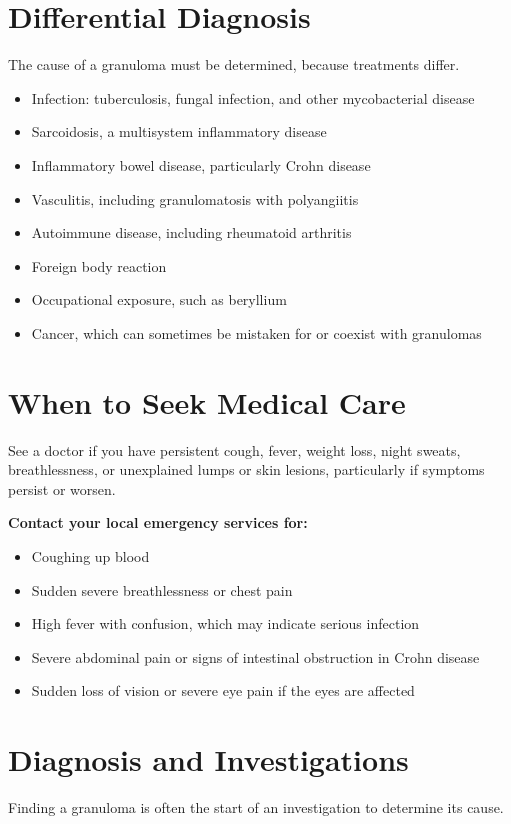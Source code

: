 \section*{Differential Diagnosis}
The cause of a granuloma must be determined, because treatments differ.

\begin{itemize}
    \item Infection: tuberculosis, fungal infection, and other mycobacterial disease
    \item Sarcoidosis, a multisystem inflammatory disease
    \item Inflammatory bowel disease, particularly Crohn disease
    \item Vasculitis, including granulomatosis with polyangiitis
    \item Autoimmune disease, including rheumatoid arthritis
    \item Foreign body reaction
    \item Occupational exposure, such as beryllium
    \item Cancer, which can sometimes be mistaken for or coexist with granulomas
\end{itemize}

\section*{When to Seek Medical Care}
See a doctor if you have persistent cough, fever, weight loss, night sweats, breathlessness, or unexplained lumps or skin lesions, particularly if symptoms persist or worsen.

\textbf{Contact your local emergency services for:}
\begin{itemize}
    \item Coughing up blood
    \item Sudden severe breathlessness or chest pain
    \item High fever with confusion, which may indicate serious infection
    \item Severe abdominal pain or signs of intestinal obstruction in Crohn disease
    \item Sudden loss of vision or severe eye pain if the eyes are affected
\end{itemize}

\section*{Diagnosis and Investigations}
Finding a granuloma is often the start of an investigation to determine its cause.

